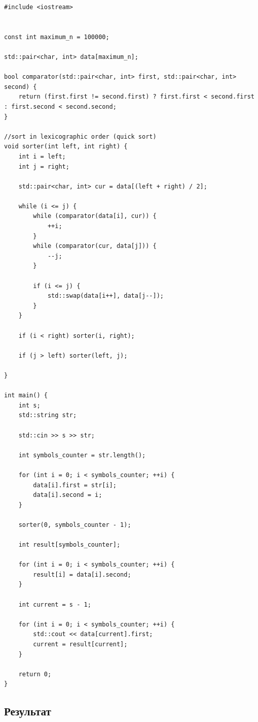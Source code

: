 \documentclass[a5paper, 10pt]{article}
\theoremstyle{definition}
\theoremstyle{plain}
\theoremstyle{remark}
\begin{document}
\begin{center}
\begin{lstlisting}[label=some-code,caption={Исходный код для 1322}]
#include <iostream>


const int maximum_n = 100000;

std::pair<char, int> data[maximum_n];

bool comparator(std::pair<char, int> first, std::pair<char, int> second) {
    return (first.first != second.first) ? first.first < second.first : first.second < second.second;
}

//sort in lexicographic order (quick sort)
void sorter(int left, int right) {
    int i = left;
    int j = right;

    std::pair<char, int> cur = data[(left + right) / 2];

    while (i <= j) {
        while (comparator(data[i], cur)) {
            ++i;
        }
        while (comparator(cur, data[j])) {
            --j;
        }

        if (i <= j) {
            std::swap(data[i++], data[j--]);
        }
    }

    if (i < right) sorter(i, right);

    if (j > left) sorter(left, j);

}

int main() {
    int s;
    std::string str;

    std::cin >> s >> str;

    int symbols_counter = str.length();

    for (int i = 0; i < symbols_counter; ++i) {
        data[i].first = str[i];
        data[i].second = i;
    }

    sorter(0, symbols_counter - 1);

    int result[symbols_counter];

    for (int i = 0; i < symbols_counter; ++i) {
        result[i] = data[i].second;
    }

    int current = s - 1;

    for (int i = 0; i < symbols_counter; ++i) {
        std::cout << data[current].first;
        current = result[current];
    }

    return 0;
}

\end{lstlisting}
\end{center}

\subsection{Результат}
\end{document}
